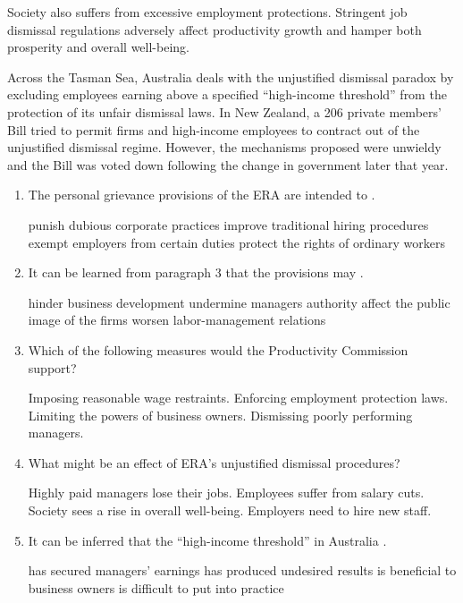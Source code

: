 Society also suffers from excessive employment protections. Stringent
job dismissal regulations adversely
affect productivity growth and hamper both prosperity and overall
well-being.




Across the Tasman Sea, Australia deals with the unjustified dismissal
paradox by excluding employees
earning above a specified ``high-income threshold'' from the protection
of its unfair dismissal laws. In New
Zealand, a 206 private members' Bill tried to permit firms and
high-income employees to contract out of the
unjustified dismissal regime. However, the mechanisms proposed were
unwieldy and the Bill was voted down
following the change in government later that year.



\begin{enumerate}[resume]
	\item
 The personal grievance provisions of the ERA are intended to \lineread.


\fourchoices
{punish dubious corporate practices}
{improve traditional hiring procedures}
{exempt employers from certain duties}
{protect the rights of ordinary workers}



\item
 It can be learned from paragraph 3 that the provisions may \lineread.

\fourchoices
{hinder business development}
{undermine managers authority}
{affect the public image of the firms}
{worsen labor-management relations}


\item
 Which of the following measures would the Productivity Commission
support?


\fourchoices
{Imposing reasonable wage restraints.}
{Enforcing employment protection laws.}
{Limiting the powers of business owners.}
{Dismissing poorly performing managers.}


\item
 What might be an effect of ERA's unjustified dismissal procedures?


\fourchoices
{Highly paid managers lose their jobs.}
{Employees suffer from salary cuts.}
{Society sees a rise in overall well-being.}
{Employers need to hire new staff.}


\item
 It can be inferred that the ``high-income threshold'' in Australia \lineread.


\fourchoices
{has secured managers' earnings}
{has produced undesired results}
{is beneficial to business owners}
{is difficult to put into practice}


	
\end{enumerate}

